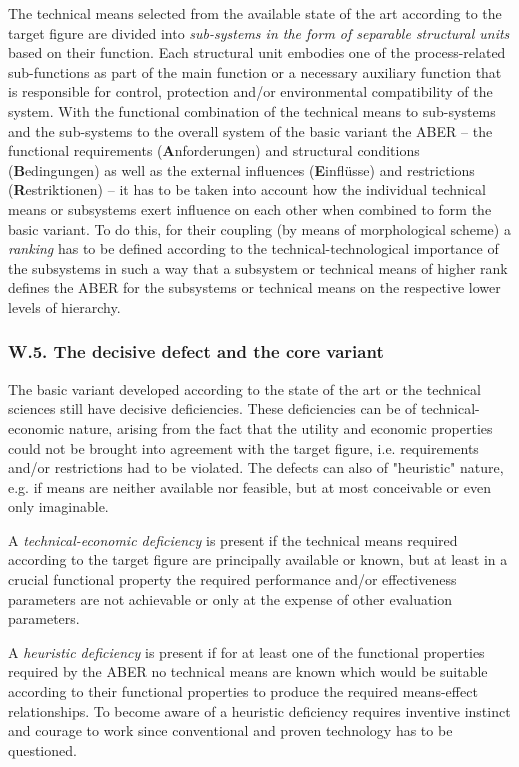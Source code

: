 \documentclass[11pt,a4paper]{article}
\begin{document}
The technical means selected from the available state of the art according to
the target figure are divided into \emph{sub-systems in the form of separable
  structural units} based on their function.  Each structural unit embodies
one of the process-related sub-functions as part of the main function or a
necessary auxiliary function that is responsible for control, protection
and/or environmental compatibility of the system. With the functional
combination of the technical means to sub-systems and the sub-systems to the
overall system of the basic variant the ABER -- the functional requirements
(\textbf{A}nforderungen) and structural conditions (\textbf{B}edingungen) as
well as the external influences (\textbf{E}infl\"usse) and restrictions
(\textbf{R}estriktionen) -- it has to be taken into account how the individual
technical means or subsystems exert influence on each other when combined to
form the basic variant. To do this, for their coupling (by means of
morphological scheme) a \emph{ranking} has to be defined according to the
technical-technological importance of the subsystems in such a way that a
subsystem or technical means of higher rank defines the ABER for the
subsystems or technical means on the respective lower levels of hierarchy.

\subsubsection*{W.5. The decisive defect and the core variant}

The basic variant developed according to the state of the art or the technical
sciences still have decisive deficiencies. These deficiencies can be of
technical-economic nature, arising from the fact that the utility and economic
properties could not be brought into agreement with the target figure, i.e.
requirements and/or restrictions had to be violated. The defects can also of
"heuristic" nature, e.g. if means are neither available nor feasible, but at
most conceivable or even only imaginable.

A \emph{technical-economic deficiency} is present if the technical means
required according to the target figure are principally available or known,
but at least in a crucial functional property the required performance and/or
effectiveness parameters are not achievable or only at the expense of other
evaluation parameters.

A \emph{heuristic deficiency} is present if for at least one of the functional
properties required by the ABER no technical means are known which would be
suitable according to their functional properties to produce the required
means-effect relationships. To become aware of a heuristic deficiency requires
inventive instinct and courage to work since conventional and proven
technology has to be questioned.
\end{document}
